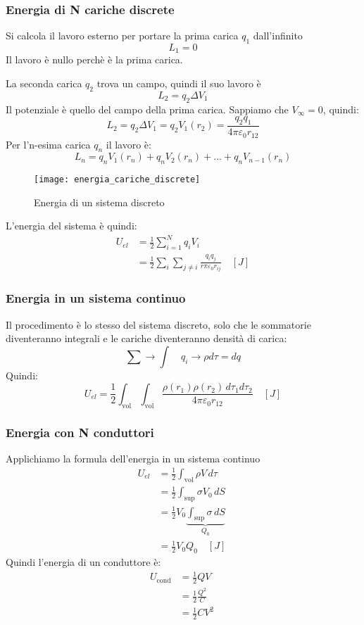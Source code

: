 \documentclass[a4paper]{article}
\begin{document}
\subsubsection{Energia di N cariche discrete}
Si calcola il lavoro esterno per portare la prima carica \( q_1 \) dall'infinito
\[
  L_1 = 0
\] 
Il lavoro è nullo perchè è la prima carica.

La seconda carica \( q_2 \)  trova un campo, quindi il suo lavoro è
\[
  L_2 = q_2 \Delta V_1
\] 
Il potenziale è quello del campo della prima carica. Sappiamo che \( V_\infty = 0 \),
quindi:
\[
  L_2 = q_2 \Delta V_1 = q_2 V_1(r_2) = \frac{q_2 q_1}{4 \pi \varepsilon_0 r_{12}}
\] 
Per l'n-esima carica \( q_n \) il lavoro è:
\[
  L_n = q_n V_1(r_n) + q_n V_2(r_n) + \ldots + q_n V_{n-1}(r_n)
\]
\begin{figure}[H]
  \centering
  \texttt{[image: energia\_cariche\_discrete]}
  \caption{Energia di un sistema discreto}
\end{figure}

\vspace{1em}
\noindent
L'energia del sistema è quindi:
\[
  \begin{aligned}
    U_{el} &= \frac{1}{2} \sum_{i=1}^N q_i V_i\\
           &= \frac{1}{2} \sum_i \sum_{j \neq i} \frac{q_i q_j}{r \pi \varepsilon_0 r_{ij}}
  \quad [J]
  \end{aligned}
\] 

\subsubsection{Energia in un sistema continuo}
Il procedimento è lo stesso del sistema discreto, solo che le sommatorie diventeranno
integrali e le cariche diventeranno densità di carica:
\[
  \sum \to \int \quad q_i \to \rho d\tau = dq
\] 
Quindi:
\[
  U_{el} = \frac{1}{2} \int_{\text{vol}} \int_{\text{vol}}
  \frac{
    \rho(r_1) \rho(r_2) \, d\tau_1 d\tau_2
  }{
    4 \pi \varepsilon_0 r_{12}
  }
  \quad [J]
\] 

\subsubsection{Energia con N conduttori}
Applichiamo la formula dell'energia in un sistema continuo
\[
  \begin{aligned}
    U_{el} &= \frac{1}{2} \int_{\text{vol}} \rho V \, d\tau\\
           &= \frac{1}{2} \int_{\text{sup}} \sigma V_0 \, dS \\
           &= \frac{1}{2} V_0 \underbrace{\int_{\text{sup}} \sigma \, dS}_{Q_0} \\
           &= \frac{1}{2} V_0 Q_0  \quad [J]\
  \end{aligned}
\] 
Quindi l'energia di un conduttore è:
\[
  \begin{aligned}
    U_{\text{cond}} &= \frac{1}{2} Q V\\
    &= \frac{1}{2} \frac{Q^2}{C} \\
    &= \frac{1}{2} C V^2 \
  \end{aligned}
\] 
\end{document}
